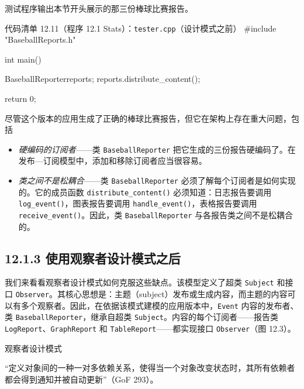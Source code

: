 
测试程序输出本节开头展示的那三份棒球比赛报告。

\begin{codeboxt}{代码清单 12.11（程序 12.1 Stats）：\texttt{tester.\allowbreak{}cpp}（设计模式之前）}
#include "BaseballReports.h"

int main()
{
    BaseballReporterreports;
    reports.distribute_content();

    return 0;
}
\end{codeboxt}


尽管这个版本的应用生成了正确的棒球比赛报告，但它在架构上存在重大问题，包括

\begin{itemize}
\item \emph{硬编码的订阅者}——类 \texttt{Baseball\allowbreak{}Reporter} 把它生成的三份报告硬编码了。在发布—订阅模型中，添加和移除订阅者应当很容易。
\item \emph{类之间不是松耦合}——类 \texttt{Baseball\allowbreak{}Reporter} 必须了解每个订阅者是如何实现的。它的成员函数 \texttt{distribute\_\allowbreak{}content(\allowbreak{})\allowbreak{}} 必须知道：日志报告要调用 \texttt{log\_\allowbreak{}event(\allowbreak{})\allowbreak{}}，图表报告要调用 \texttt{handle\_\allowbreak{}event(\allowbreak{})\allowbreak{}}，表格报告要调用 \texttt{receive\_\allowbreak{}event(\allowbreak{})\allowbreak{}}。因此，类 \texttt{Baseball\allowbreak{}Reporter} 与各报告类之间不是松耦合的。
\end{itemize}

\subsection{12.1.3 使用观察者设计模式之后}

我们来看看观察者设计模式如何克服这些缺点。该模型定义了超类 \texttt{Subject} 和接口 \texttt{Observer}。其核心思想是：主题（subject）发布或生成内容，而主题的内容可以有多个观察者。因此，在依据该模式建模的应用版本中，\texttt{Event} 内容的发布者、类 \texttt{Baseball\allowbreak{}Reporter}，继承自超类 \texttt{Subject}。内容的每个订阅者——报告类 \texttt{LogReport}、\texttt{Graph\allowbreak{}Report} 和 \texttt{Table\allowbreak{}Report}——都实现接口 \texttt{Observer}（图 12.3）。

\begin{mySidebar}{观察者设计模式}

“定义对象间的一种一对多依赖关系，使得当一个对象改变状态时，其所有依赖者都会得到通知并被自动更新”（GoF 293）。
\end{mySidebar}

